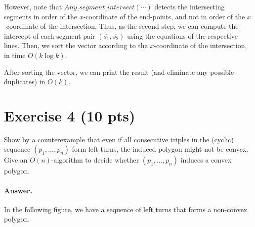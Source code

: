 \documentclass[a4paper]{article}
\begin{document}
However, note that ${Any\_segment\_intersect}(\cdots)$ detects the intersecting segments in order of the $x$-coordinate of the end-points, and not in order of the $x$-coordinate of the intersection. Thus, as the second step, we can compute the intercept of each segment pair $(\overline{s_1}, \overline{s_2})$ using the equations of the respective lines. Then, we sort the vector according to the $x$-coordinate of the intersection, in time $O(k \log k)$.

After sorting the vector, we can print the result (and eliminate any possible duplicates) in $O(k)$. 

\section*{Exercise 4 (10 pts)}

Show by a counterexample that even if all consecutive triples in the (cyclic) sequence $(p_1, \ldots, p_n)$ form left turns, the induced polygon might not be convex. Give an $O(n)$-algorithm to decide whether $(p_1, \ldots, p_n)$ induces a convex polygon.

\paragraph{Answer.}

In the following figure, we have a sequence of left turns that forms a non-convex polygon.

\begin{figure}[h]
\centering
{}
\end{figure}
\end{document}
